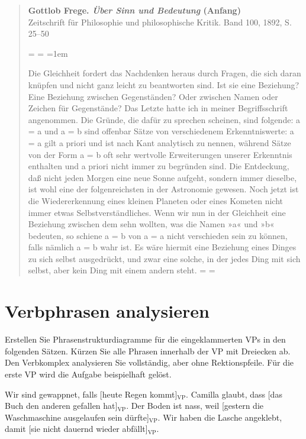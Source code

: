 \documentclass[12pt,a4paper,twoside]{article}
\newcommand{\grau}[1]{\textcolor{grau}{#1}}
\newcommand{\Sub}[1]{\ensuremath{_{\text{#1}}}}
\newenvironment{nohyphens}{%
  \par
  \hyphenpenalty=10000
  \exhyphenpenalty=10000
  \sloppy
}{\par}
\newenvironment{spread}
{%
  \newdimen\origiwspc%
  \newdimen\origiwstr%
  \origiwspc=\fontdimen2\font%
  \origiwstr=\fontdimen3\font%
  \fontdimen2\font=1em%
  \doublespacing%
}{%
  \fontdimen2\font=\origiwspc%
  \fontdimen3\font=\origiwstr%
}
\begin{document}
\begin{quote}
  \textbf{Gottlob Frege. \textit{Über Sinn und Bedeutung} (Anfang)}\\
  \footnotesize{Zeitschrift für Philosophie und philosophische Kritik. Band 100, 1892, S. 25–50}\\
  
  \begin{nohyphens}
  \begin{spread}
    Die Gleichheit fordert das Nachdenken heraus durch Fragen, die sich daran knüpfen und nicht ganz leicht zu beantworten sind.
    Ist sie eine Beziehung? Eine Beziehung zwischen Gegenständen? Oder zwischen Namen oder Zeichen für Gegenstände?
    Das Letzte hatte ich in meiner Begriffsschrift angenommen.
    Die Gründe, die dafür zu sprechen scheinen, sind folgende: a = a und a = b sind offenbar Sätze von verschiedenem Erkenntniswerte: a = a gilt a priori und ist nach Kant analytisch zu nennen, während Sätze von der Form a = b oft sehr wertvolle Erweiterungen unserer Erkenntnis enthalten und a priori nicht immer zu begründen sind.
    Die Entdeckung, daß nicht jeden Morgen eine neue Sonne aufgeht, sondern immer dieselbe, ist wohl eine der folgenreichsten in der Astronomie gewesen.
    Noch jetzt ist die Wiedererkennung eines kleinen Planeten oder eines Kometen nicht immer etwas Selbstverständliches.
    Wenn wir nun in der Gleichheit eine Beziehung zwischen dem sehn wollten, was die Namen »a« und »b« bedeuten, so schiene a = b von a = a nicht verschieden sein zu können, falls nämlich a = b wahr ist.
    Es wäre hiermit eine Beziehung eines Dinges zu sich selbst ausgedrückt, und zwar eine solche, in der jedes Ding mit sich selbst, aber kein Ding mit einem andern steht.
  \end{spread}
  \end{nohyphens}
\end{quote}

\section{Verbphrasen analysieren}\label{sec:analyse}

Erstellen Sie Phrasenstrukturdiagramme für die eingeklammerten VPs in den folgenden Sätzen.
Kürzen Sie alle Phrasen innerhalb der VP mit Dreiecken ab.
Den Verbkomplex analysieren Sie vollständig, aber ohne Rektionspfeile.
Für die erste VP wird die Aufgabe beispielhaft gelöst.

\begin{exe}
\setcounter{xnumi}{0}
  \ex \grau{Wir sind gewappnet, falls} [heute Regen kommt]\Sub{VP}\grau{.}
  \ex \grau{Camilla glaubt, dass} [das Buch den anderen gefallen hat]\Sub{VP}\grau{.}
  \ex \grau{Der Boden ist nass, weil} [gestern die Waschmaschine ausgelaufen sein dürfte]\Sub{VP}\grau{.}
  \ex \grau{Wir haben die Lasche angeklebt, damit} [sie nicht dauernd wieder abfällt]\Sub{VP}\grau{.}
\end{exe}
\end{document}
